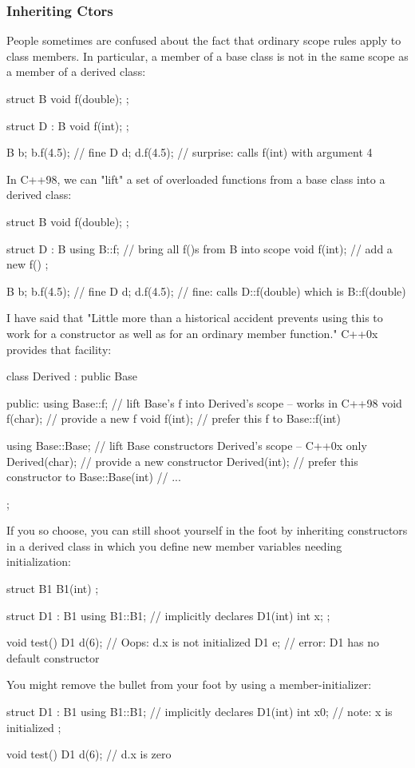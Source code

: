 \begin{frame}[fragile]
\frametitle{Inheriting Ctors}

People sometimes are confused about the fact that ordinary scope rules apply to class members. In particular, a member of a base class is not in the same scope as a member of a derived class:


	struct B {
		void f(double);
	};

	struct D : B {
		void f(int);
	};

	B b;   b.f(4.5);	// fine
	D d;   d.f(4.5);	// surprise: calls f(int) with argument 4

In C++98, we can "lift" a set of overloaded functions from a base class into a derived class:


	struct B {
		void f(double);
	};

	struct D : B {
		using B::f;     // bring all f()s from B into scope
		void f(int);    // add a new f()
	};

	B b;   b.f(4.5);	// fine
	D d;   d.f(4.5);	// fine: calls D::f(double) which is B::f(double)

I have said that "Little more than a historical accident prevents using this to work for a constructor as well as for an ordinary member function." C++0x provides that facility:


	class Derived : public Base { 
	public: 
		using Base::f;    // lift Base's f into Derived's scope -- works in C++98
		void f(char);     // provide a new f 
		void f(int);      // prefer this f to Base::f(int) 

		using Base::Base; // lift Base constructors Derived's scope -- C++0x only
		Derived(char);    // provide a new constructor 
		Derived(int);     // prefer this constructor to Base::Base(int) 
		// ...
	}; 

If you so choose, you can still shoot yourself in the foot by inheriting constructors in a derived class in which you define new member variables needing initialization:


	struct B1 {
		B1(int) { }
	};

	struct D1 : B1 {
		using B1::B1; // implicitly declares D1(int)
		int x;
	};

	void test()
	{
		D1 d(6);	// Oops: d.x is not initialized
		D1 e;		// error: D1 has no default constructor
	}

You might remove the bullet from your foot by using a member-initializer:


    	struct D1 : B1 {
    		using B1::B1;	// implicitly declares D1(int)
    		int x{0};	// note: x is initialized
    	};

    	void test()
    	{
    		D1 d(6);	// d.x is zero
    	}



\end{frame}


